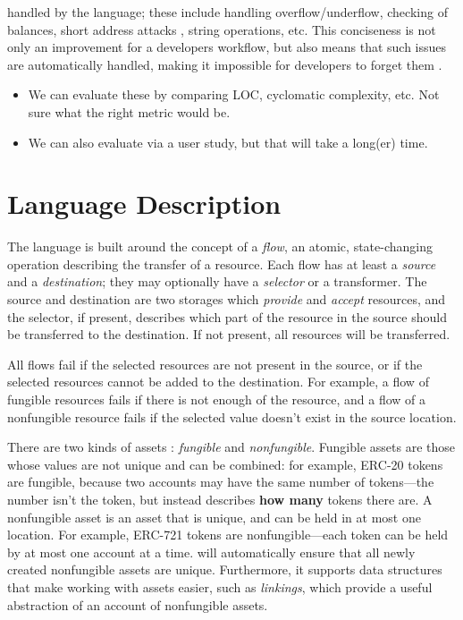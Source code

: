 \documentclass[sigconf]{acmart}
\begin{document}
        handled by the language; these include handling overflow/underflow, checking of balances, short address attacks , string operations, etc.
        This conciseness is not only an improvement for a developers workflow, but also means that such issues are automatically handled, making it impossible for developers to forget them .
        \begin{itemize}
            \item We can evaluate these by comparing LOC, cyclomatic complexity, etc.
                Not sure what the right metric would be.

            \item We can also evaluate via a user study, but that will take a long(er) time.
        \end{itemize}

\section{Language Description}
The \langName language is built around the concept of a \emph{flow}, an atomic, state-changing operation describing the transfer of a resource.
Each flow has at least a \emph{source} and a \emph{destination}; they may optionally have a \emph{selector} or a transformer.
The source and destination are two storages which \emph{provide} and \emph{accept} resources, and the selector, if present, describes which part of the resource in the source should be transferred to the destination.
If not present, all resources will be transferred.

All flows fail if the selected resources are not present in the source, or if the selected resources cannot be added to the destination.
For example, a flow of fungible resources fails if there is not enough of the resource, and a flow of a nonfungible resource fails if the selected value doesn't exist in the source location.

There are two kinds of assets : \emph{fungible} and \emph{nonfungible}.
Fungible assets are those whose values are not unique and can be combined: for example, ERC-20 tokens are fungible, because two accounts may have the same number of tokens---the number isn't the token, but instead describes \textbf{how many} tokens there are.
A nonfungible asset is an asset that is unique, and can be held in at most one location.
For example, ERC-721  tokens are nonfungible---each token can be held by at most one account at a time.
\langName will automatically ensure that all newly created nonfungible assets are unique.
Furthermore, it supports data structures that make working with assets easier, such as \emph{linkings}, which provide a useful abstraction of an account of nonfungible assets.
\end{document}
